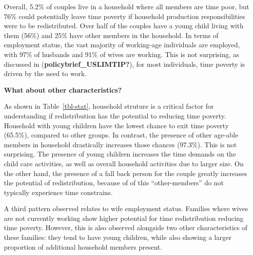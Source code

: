 \documentclass[
  11pt,
]{article}
\begin{document}
Overall, 5.2\% of couples live in a household where all members are time
poor, but 76\% could potentially leave time poverty if household
production responsibilities were to be redistributed. Over half of the
couples have a young child living with them (56\%) and 25\% have other
members in the household. In terms of employment status, the vast
majority of working-age individuals are employed, with 97\% of husbands
and 91\% of wives are working. This is not surprising, as discussed in
(\textbf{policybrief\_USLIMTIP?}), for most individuals, time poverty is
driven by the need to work.

\textbf{What about other characteristics?}

As shown in Table~\ref{tbl-stat}, household struture is a critical
factor for understanding if redistribution has the potential to reducing
time poverty. Household with young children have the lowest chance to
exit time poverty (65.5\%), compared to other groups. In contrast, the
presence of other age-able members in household drastically increases
those chances (97.3\%). This is not surprising. The presence of young
children increases the time demands on the child care activities, as
well as overall household activities due to larger size. On the other
hand, the presence of a fall back person for the couple greatly
increases the potential of redistribution, because of of this
``other-members'' do not typically experience time constrains.

A third pattern observed relates to wife employment status. Families
where wives are not currently working show higher potential for time
redistribution reducing time poverty. However, this is also observed
alongside two other characteristics of these families: they tend to have
young children, while also showing a larger proportion of additional
household members present.
\end{document}

